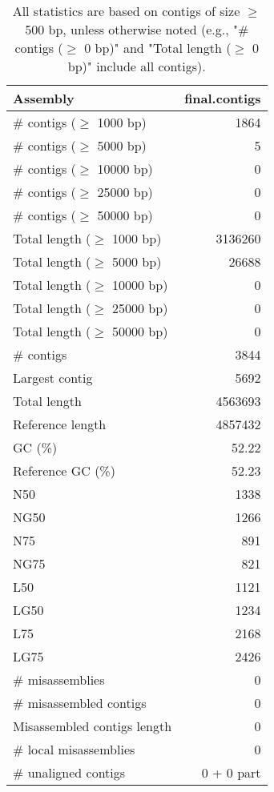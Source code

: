 \documentclass[12pt,a4paper]{article}
\begin{document}
\begin{table}[ht]
\begin{center}
\caption{All statistics are based on contigs of size $\geq$ 500 bp, unless otherwise noted (e.g., "\# contigs ($\geq$ 0 bp)" and "Total length ($\geq$ 0 bp)" include all contigs).}
\begin{tabular}{|l*{1}{|r}|}
\hline
Assembly & final.contigs \\ \hline
\# contigs ($\geq$ 1000 bp) & 1864 \\ \hline
\# contigs ($\geq$ 5000 bp) & 5 \\ \hline
\# contigs ($\geq$ 10000 bp) & 0 \\ \hline
\# contigs ($\geq$ 25000 bp) & 0 \\ \hline
\# contigs ($\geq$ 50000 bp) & 0 \\ \hline
Total length ($\geq$ 1000 bp) & 3136260 \\ \hline
Total length ($\geq$ 5000 bp) & 26688 \\ \hline
Total length ($\geq$ 10000 bp) & 0 \\ \hline
Total length ($\geq$ 25000 bp) & 0 \\ \hline
Total length ($\geq$ 50000 bp) & 0 \\ \hline
\# contigs & 3844 \\ \hline
Largest contig & 5692 \\ \hline
Total length & 4563693 \\ \hline
Reference length & 4857432 \\ \hline
GC (\%) & 52.22 \\ \hline
Reference GC (\%) & 52.23 \\ \hline
N50 & 1338 \\ \hline
NG50 & 1266 \\ \hline
N75 & 891 \\ \hline
NG75 & 821 \\ \hline
L50 & 1121 \\ \hline
LG50 & 1234 \\ \hline
L75 & 2168 \\ \hline
LG75 & 2426 \\ \hline
\# misassemblies & 0 \\ \hline
\# misassembled contigs & 0 \\ \hline
Misassembled contigs length & 0 \\ \hline
\# local misassemblies & 0 \\ \hline
\# unaligned contigs & 0 + 0 part \\ \hline

\end{tabular}
\end{center}
\end{table}
\end{document}
